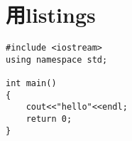 \documentclass[UTF8]{ctexart}
\begin{document}
  \section{用listings}

  \lstset{language=C}
  \begin{lstlisting}
#include <iostream>
using namespace std;

int main()
{
    cout<<"hello"<<endl;
    return 0;
}
  \end{lstlisting}
\end{document}
